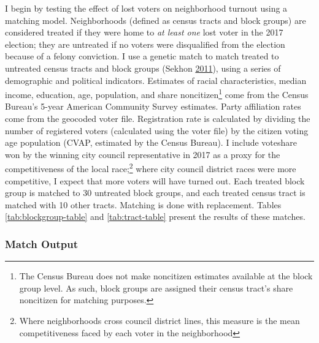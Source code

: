 \documentclass[
  12pt,
]{article}
\begin{document}
I begin by testing the effect of lost voters on neighborhood turnout using a matching model. Neighborhoods (defined as census tracts and block groups) are considered treated if they were home to \emph{at least one} lost voter in the 2017 election; they are untreated if no voters were disqualified from the election because of a felony conviction. I use a genetic match to match treated to untreated census tracts and block groups (Sekhon \protect\hyperlink{ref-Sekhon2011}{2011}), using a series of demographic and political indicators. Estimates of racial characteristics, median income, education, age, population, and share noncitizen\footnote{The Census Bureau does not make noncitizen estimates available at the block group level. As such, block groups are assigned their census tract's share noncitizen for matching purposes.} come from the Census Bureau's 5-year American Community Survey estimates. Party affiliation rates come from the geocoded voter file. Registration rate is calculated by dividing the number of registered voters (calculated using the voter file) by the citizen voting age population (CVAP, estimated by the Census Bureau). I include voteshare won by the winning city council representative in 2017 as a proxy for the competitiveness of the local race;\footnote{Where neighborhoods cross council district lines, this measure is the mean competitiveness faced by each voter in the neighborhood} where city council district races were more competitive, I expect that more voters will have turned out. Each treated block group is matched to 30 untreated block groups, and each treated census tract is matched with 10 other tracts. Matching is done with replacement. Tables \ref{tab:blockgroup-table} and \ref{tab:tract-table} present the results of these matches.

\hypertarget{match-output}{%
\subsubsection*{Match Output}\label{match-output}}
\end{document}
